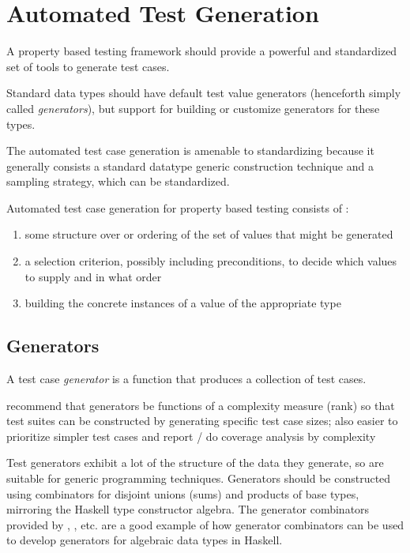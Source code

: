 \section{Automated Test Generation}

A property based testing framework should provide a
powerful and standardized set of tools to generate test cases.

Standard data types should have default test value generators 
(henceforth simply called \emph{generators}), 
but support for building or customize generators for these types.

The automated test case generation is amenable to standardizing
because it generally consists a standard datatype generic construction technique
and a sampling strategy, which can be standardized.

Automated test case generation for property based testing consists of :

\begin{enumerate}
\item some structure over or ordering of the set of values that might be generated
\item a selection criterion, possibly including preconditions, to decide which values to supply and in what order
\item building the concrete instances of a value of the appropriate type
\end{enumerate}

\subsection{Generators}

A test case \emph{generator} is a function that produces a collection of test cases.

recommend that generators be functions of a complexity measure (rank)
so that test suites can be constructed by generating specific test case sizes;
also easier to prioritize simpler test cases and report / do coverage analysis by complexity

Test generators exhibit a lot of the structure of the data they generate,
so are suitable for generic programming techniques.
Generators should be constructed using combinators for 
disjoint unions (sums) and products of base types,
mirroring the Haskell type constructor algebra.
The generator combinators provided by \QC, \SC, etc.
are a good example of how generator combinators can be used
to develop generators for algebraic data types in Haskell.

